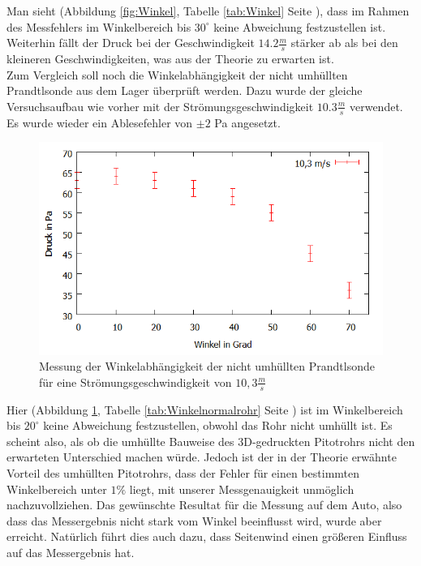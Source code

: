 Man sieht (Abbildung \ref{fig:Winkel}, Tabelle \ref{tab:Winkel} Seite \pageref{tab:Winkel}), dass im Rahmen des Messfehlers im Winkelbereich bis $30^\circ$ keine Abweichung festzustellen ist. Weiterhin fällt der Druck bei der Geschwindigkeit $14.2 \frac{m}{s}$ stärker ab als bei den kleineren Geschwindigkeiten, was aus der Theorie zu erwarten ist.
\\
Zum Vergleich soll noch die Winkelabhängigkeit der nicht umhüllten Prandtlsonde aus dem Lager überprüft werden. Dazu wurde der gleiche Versuchsaufbau wie vorher mit der Strömungsgeschwindigkeit $10.3 \frac{m}{s}$ verwendet. Es wurde wieder ein Ablesefehler von $\pm 2$ Pa angesetzt.
\begin{figure}
      \includegraphics[width=.9\textwidth]{images/Winkelnormalrohr}
\caption{Messung der Winkelabhängigkeit der nicht umhüllten Prandtlsonde für eine Strömungsgeschwindigkeit von $10,3 \frac{m}{s}$}
\label{fig:Winkelnormalrohr}
\end{figure}
Hier (Abbildung \ref{fig:Winkelnormalrohr}, Tabelle \ref{tab:Winkelnormalrohr} Seite \pageref{tab:Winkelnormalrohr}) ist im Winkelbereich bis $20^\circ$ keine Abweichung festzustellen, obwohl das Rohr nicht umhüllt ist.
Es scheint also, als ob die umhüllte Bauweise des 3D-gedruckten Pitotrohrs nicht den erwarteten Unterschied machen würde. Jedoch ist der in der Theorie erwähnte Vorteil des umhüllten Pitotrohrs, dass der Fehler für einen bestimmten Winkelbereich unter $1\%$ liegt, mit unserer Messgenauigkeit unmöglich nachzuvollziehen. Das gewünschte Resultat für die Messung auf dem Auto, also dass das Messergebnis nicht stark vom Winkel beeinflusst wird, wurde aber erreicht. Natürlich führt dies auch dazu, dass Seitenwind einen größeren Einfluss auf das Messergebnis hat. 
